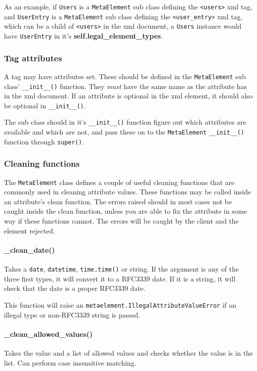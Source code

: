 As an example, if \texttt{Users} is a \texttt{MetaElement} sub class defining
the \texttt{<users>} \gls{xml} tag, and \texttt{UserEntry} is a
\texttt{MetaElement} sub class defining the \texttt{<user\_entry>} \gls{xml}
tag, which can be a child of \texttt{<users>} in the \gls{xml} document, a
\texttt{Users} instance would have \texttt{UserEntry} in it's
\textbf{self.legal\_element\_types}.

\subsubsection{Tag attributes}
A tag may have attributes set. These should be defined in the
\texttt{MetaElement} sub class' \texttt{\_\_init\_\_()} function. They
\textit{must} have the same name as the attribute has in the \gls{xml}
document. If an attribute is optional in the \gls{xml} element, it should also
be optional in \texttt{\_\_init\_\_()}. 

The sub class should in it's \texttt{\_\_init\_\_()} function figure out which
attributes are available and which are not, and pass these on to the
\texttt{MetaElement} \texttt{\_\_init\_\_()} function through \texttt{super()}. 

\subsubsection{Cleaning functions}
\label{sec:metaelement_cleaning_functions}
The \texttt{MetaElement} class defines a couple of useful cleaning functions
that are commonly used in cleaning attribute values. These functions may be
called inside an attribute's clean function. The errors raised should in most
cases not be caught inside the clean function, unless you are able to fix the
attribute in some way if these functions cannot. The errors will be caught by
the client and the element rejected. 

\paragraph{\_clean\_date()} Takes a \texttt{date}, \texttt{datetime},
\texttt{time.time()} or string. If the argument is any of the three first
types, it will convert it to a RFC3339 date. If it is a string, it will check
that the date is a proper RFC3339 date. 

This function will raise an \texttt{metaelement.IllegalAttributeValueError} if
an illegal type or non-RFC3339 string is passed.

\paragraph{\_clean\_allowed\_values()} Takes the value and a list of allowed
values and checks whether the value is in the list. Can perform case
insensitive matching.

